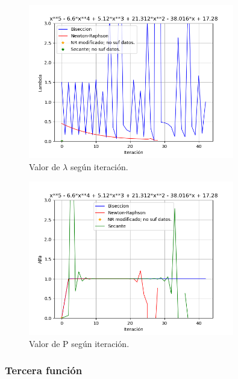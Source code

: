 \documentclass[titlepage,a4paper]{article}
\begin{document}
\begin{figure}[H]
\centering
\includegraphics[width=0.8\textwidth]{lambda f2.png}
\caption{\label{fig:class01}Valor de $\lambda$ según iteración.}
\end{figure}
\begin{figure}[H]
\centering
\includegraphics[width=0.8\textwidth]{alfa f2.png}
\caption{\label{fig:class01}Valor de P según iteración.}
\end{figure}

\subsubsection{Tercera función}\label{sec:CR3}
\end{document}
